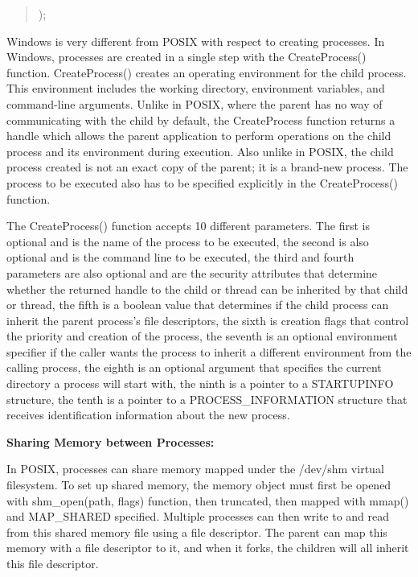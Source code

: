 \documentclass[letterpaper,10pt,titlepage]{article}
\newcommand{\tab}{\hspace*{2em}} %
\begin{document}
\begin{enumerate}
\begin{quote}
);
\end{quote}

\tab Windows is very different from POSIX with respect to creating processes. In Windows, processes are created in a single step with the CreateProcess() function. CreateProcess() creates an operating environment for the child process. This environment includes the working directory, environment variables, and command-line arguments. Unlike in POSIX, where the parent has no way of communicating with the child by default, the CreateProcess function returns a handle which allows the parent application to perform operations on the child process and its environment during execution. Also unlike in POSIX, the child process created is not an exact copy of the parent; it is a brand-new process. The process to be executed also has to be specified explicitly in the CreateProcess() function. \newline

\tab The CreateProcess() function accepts 10 different parameters. The first is optional and is the name of the process to be executed, the second is also optional and is the command line to be executed, the third and fourth parameters are also optional and are the security attributes that determine whether the returned handle to the child or thread can be inherited by that child or thread, the fifth is a boolean value that determines if the child process can inherit the parent process's file descriptors, the sixth is creation flags that control the priority and creation of the process, the seventh is an optional environment specifier if the caller wants the process to inherit a different environment from the calling process, the eighth is an optional argument that specifies the current directory a process will start with, the ninth is a pointer to a STARTUPINFO structure, the tenth is a pointer to a PROCESS\_INFORMATION structure that receives identification information about the new process. \newline

\textbf{Sharing Memory between Processes:} \newline


\tab In POSIX, processes can share memory mapped under the /dev/shm virtual filesystem. To set up shared memory, the memory object must first be opened with shm\_open(path, flags) function, then truncated, then mapped with mmap() and MAP\_SHARED specified. Multiple processes can then write to and read from this shared memory file using a file descriptor. The parent can map this memory with a file descriptor to it, and when it forks, the children will all inherit this file descriptor. \newline


\end{enumerate}
\end{document}
